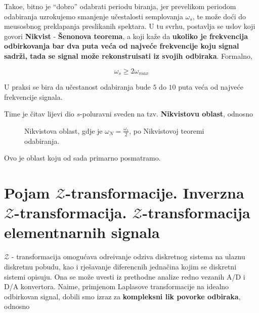 \documentclass[12pt]{IEEEtran}
\numberwithin{equation}{subsection}
\numberwithin{figure}{section}
\begin{document}
Tako\dj{}e, bitno je \enquote{dobro} odabrati periodu biranja, jer prevelikom periodom
odabiranja uzrokujemo smanjenje u\v{c}estalosti semplovanja $\omega_{s}$, 
te mo\v{z}e do\'{c}i do me\dj{}usosbnog preklapanja preslikanih spektara. U tu svrhu, postavlja se uslov koji govori \textbf{Nikvist} - \textbf{\v{S}enonova teorema},
a koji ka\v{z}e da \textbf{ukoliko je frekvencija odbirkovanja bar dva puta ve\'{c}a od 
najve\'{c}e frekvencije koju signal sadr\v{z}i, tada se signal mo\v{z}e 
rekonstruisati iz svojih odbiraka}. Formalno, 

\begin{equation}
    \omega_{s} \geq 2 \omega_{max}
\end{equation}

U praksi se bira da u\v{c}estanost odabiranja bude $5$ do $10$ puta ve\'{c}a 
od najve\'{c}e frekvencije signala. 

\newpage
Time je \v{c}itav lijevi dio $s$-poluravni sveden na tzv. \textbf{Nikvistovu oblast}, 
odnosno 

\begin{figure}[h]
    \centering
    \caption{Nikvistova oblast, gdje je $\omega_{N} = \frac{\omega_{s}}{2}$, po Nikvistovoj teoremi odabiranja.}
\end{figure}

Ovo je oblast koju od sada primarno posmatramo.

\newpage
\section{\textbf{Pojam $\mathcal{Z}$-transformacije. Inverzna $\mathcal{Z}$-transformacija. $\mathcal{Z}$-transformacija elementnarnih signala}}

$\mathcal{Z}$ - transformacija omogu\'{c}ava odre\dj{}ivanje odziva diskretnog 
sistema na ulaznu diskretnu pobudu, kao i rje\v{s}avanje diferencnih jedna\v{c}ina
kojim se diskretni sistemi opisuju. Ona se mo\v{z}e uvesti iz prethodne 
analize redno vezanih A/D i D/A konvertora. Naime, primjenom Laplasove 
transformacije na idealno odbirkovan signal, dobili smo izraz za 
\textbf{kompleksni lik povorke odbiraka}, odnosno 
\end{document}
